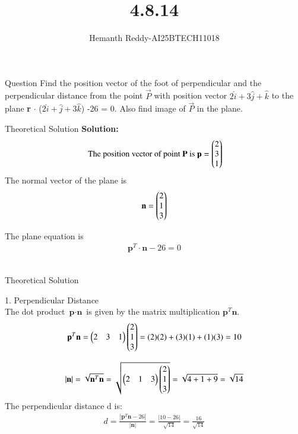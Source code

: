 \documentclass{beamer}
\title %
{ 4.8.14}
\author %
{Hemanth Reddy-AI25BTECH11018}
\begin{document}
\frame{\titlepage}
\begin{frame}{Question}
Find the position vector of the foot of perpendicular and the perpendicular distance from the point  $ \vec{P}$ with position vector $2\hat{i}  + 3  \hat{j}  + \hat{k} $ to the plane    \textbf{r} $\cdot$ ($ 2\hat{i}  +   \hat{j}  + 3\hat{k}$) -26 = 0.
 Also find image of $ \vec{P}$  in the plane.
\end{frame}



\begin{frame}{Theoretical Solution}
\textbf{Solution:}\\

\begin{align}
   \text{ The position vector of point }  \mathbf{P} \text{ is }
  \textbf{p} = \begin{pmatrix} 2 \\ 3 \\ 1 \end{pmatrix} 
\end{align}
 The normal vector of the plane is 
\begin{align}
    \textbf{n} = \begin{pmatrix} 2 \\ 1 \\ 3 \end{pmatrix}
\end{align}



The plane equation is
\begin{align}
    \textbf{p}^T \cdot \textbf{n} - 26 = 0
\end{align} \\



\end{frame}

\begin{frame}{Theoretical Solution}

1. Perpendicular Distance\\

The dot product $\textbf{p} \cdot \textbf{n}$ is given by the matrix multiplication $\textbf{p}^T \textbf{n}$.\\

\begin{align}
    \textbf{p}^{T} \textbf{n} = \begin{pmatrix} 2 & 3 & 1 \end{pmatrix} \begin{pmatrix} 2 \\ 1 \\ 3 \end{pmatrix} = (2)(2) + (3)(1) + (1)(3) = 10
\end{align}
 

\begin{align}
    |\textbf{n}| = \sqrt{\textbf{n}^T \textbf{n}} = \sqrt{\begin{pmatrix} 2 & 1 & 3 \end{pmatrix} \begin{pmatrix} 2 \\ 1 \\ 3 \end{pmatrix}} = \sqrt{4+1+9} = \sqrt{14}
\end{align}
The perpendicular distance d is:
\begin{align}
    d = \frac{|\textbf{p}^T \textbf{n} - 26|}{|\textbf{n}|} = \frac{|10-26|}{\sqrt{14}} = \frac{16}{\sqrt{14}}
\end{align}

\end{frame}
\end{document}

